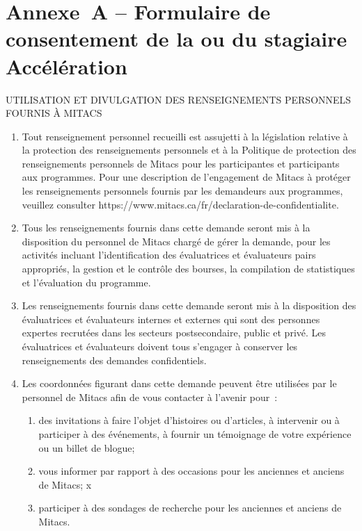 \section*{Annexe A – Formulaire de consentement de la ou du stagiaire Accélération\oblig}

{
\bfseries
\begin{center}
\MakeUppercase{Utilisation et divulgation des renseignements personnels fournis à Mitacs}
\end{center}

\begin{enumerate}
\item Tout renseignement personnel recueilli est assujetti à la législation relative à la protection des renseignements personnels et à la Politique de protection des renseignements personnels de Mitacs pour les participantes et participants aux programmes. Pour une description de l'engagement de Mitacs à protéger les renseignements personnels fournis par les demandeurs aux programmes, veuillez consulter https://www.mitacs.ca/fr/declaration-de-confidentialite.
\item Tous les renseignements fournis dans cette demande seront mis à la disposition du personnel de Mitacs chargé de gérer la demande, pour les activités incluant l'identification des évaluatrices et évaluateurs pairs appropriés, la gestion et le contrôle des bourses, la compilation de statistiques et l'évaluation du programme.
\item Les renseignements fournis dans cette demande seront mis à la disposition des évaluatrices et évaluateurs internes et externes qui sont des personnes expertes recrutées dans les secteurs postsecondaire, public et privé. Les évaluatrices et évaluateurs doivent tous s'engager à conserver les renseignements des demandes confidentiels.
\item Les coordonnées figurant dans cette demande peuvent être utilisées par le personnel de Mitacs afin de vous contacter à l'avenir pour :
\begin{enumerate}
\item des invitations à faire l'objet d'histoires ou d'articles, à intervenir ou à participer à des événements, à fournir un témoignage de votre expérience ou un billet de blogue;
\item vous informer par rapport à des occasions pour les anciennes et anciens de Mitacs;
x
\item participer à des sondages de recherche pour les anciennes et anciens de Mitacs.
\end{enumerate}

\end{enumerate}}

